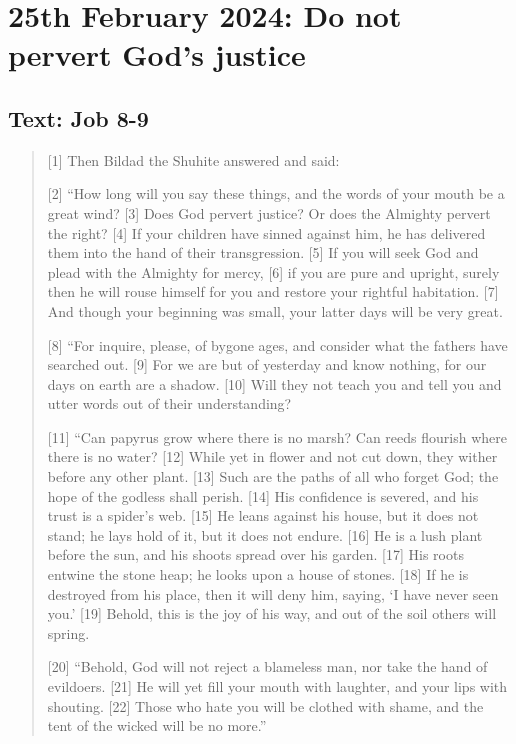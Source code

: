 \setcounter{figure}{0}

\section{25th February 2024: Do not pervert God's justice}
\subsection*{Text: Job 8-9}
  \begin{quote}
    [1] Then Bildad the Shuhite answered and said:

    [2] “How long will you say these things,
        and the words of your mouth be a great wind?
    [3] Does God pervert justice?
        Or does the Almighty pervert the right?
    [4] If your children have sinned against him,
        he has delivered them into the hand of their transgression.
    [5] If you will seek God
        and plead with the Almighty for mercy,
    [6] if you are pure and upright,
        surely then he will rouse himself for you
        and restore your rightful habitation.
    [7] And though your beginning was small,
        your latter days will be very great.


    [8] “For inquire, please, of bygone ages,
        and consider what the fathers have searched out.
    [9] For we are but of yesterday and know nothing,
        for our days on earth are a shadow.
    [10] Will they not teach you and tell you
        and utter words out of their understanding?


    [11] “Can papyrus grow where there is no marsh?
        Can reeds flourish where there is no water?
    [12] While yet in flower and not cut down,
        they wither before any other plant.
    [13] Such are the paths of all who forget God;
        the hope of the godless shall perish.
    [14] His confidence is severed,
        and his trust is a spider’s web.
    [15] He leans against his house, but it does not stand;
        he lays hold of it, but it does not endure.
    [16] He is a lush plant before the sun,
        and his shoots spread over his garden.
    [17] His roots entwine the stone heap;
        he looks upon a house of stones.
    [18] If he is destroyed from his place,
        then it will deny him, saying, ‘I have never seen you.’
    [19] Behold, this is the joy of his way,
        and out of the soil others will spring.


    [20] “Behold, God will not reject a blameless man,
        nor take the hand of evildoers.
    [21] He will yet fill your mouth with laughter,
        and your lips with shouting.
    [22] Those who hate you will be clothed with shame,
        and the tent of the wicked will be no more.”


\end{quote}
